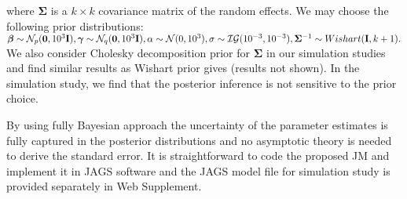 \noindent where $\boldsymbol{\Sigma}$ is a $k\times k$ covariance matrix of the random effects. We may choose the following prior distributions:
$\boldsymbol{\beta} \sim \mathcal{N}_p({\boldsymbol 0}, 10^3{\bf I}), \boldsymbol{\gamma} \sim \mathcal{N}_q({\boldsymbol 0}, 10^3{\bf I}), \alpha\sim \mathcal{N}(0, 10^3), \sigma\sim \mathcal{IG}(10^{-3}, 10^{-3}), \boldsymbol{\Sigma}^{-1}\sim Wishart({\bf I}, k+1). $
We also consider Cholesky decomposition prior for $\boldsymbol{\Sigma}$ in our simulation studies and find similar results as Wishart prior gives (results not shown). In the simulation study, we find that the posterior inference is not sensitive to the prior choice.

By using fully Bayesian approach the uncertainty of the parameter estimates is fully captured in the posterior distributions and no asymptotic theory is needed to derive the standard error. It is straightforward to code the proposed JM and implement it in \textsf{JAGS} software \citep{plummer2003jags} and the \textsf{JAGS} model file for simulation study is provided separately in Web Supplement.









%
%
% 


% 